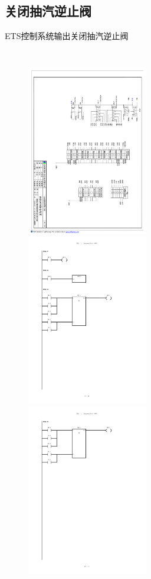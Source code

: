 \documentclass[12pt,hyperref={CJKbookmarks=true}]{beamer} %
\begin{document}
\subsection{关闭抽汽逆止阀}
\begin{frame}{ETS控制系统输出}{关闭抽汽逆止阀}
  		\begin{columns}
\begin{figure}
\includegraphics[angle=90,width=150pt,trim=250 400 420 100,clip]{picture/ets8.pdf}\\
\includegraphics[angle=0,width=150pt,trim=0 350 50 250,clip]{picture/plc9.pdf}\\
\includegraphics[angle=0,width=150pt,trim=0 550 50 50,clip]{picture/plc10.pdf}
	

\end{figure}
\end{columns}
\end{frame}
\end{document}
